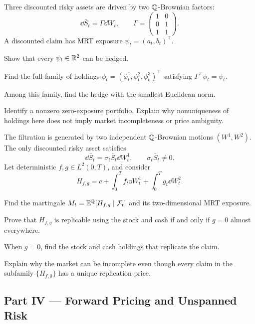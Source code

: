 \begin{exercise}
Three discounted risky assets are driven by two \(\mathbb{Q}\)-Brownian factors:
\[
\dd\bar S_t=\Gamma\dd W_t,
\qquad
\Gamma=
\begin{pmatrix}
1&0\\
0&1\\
1&1
\end{pmatrix}.
\]
A discounted claim has MRT exposure
\(\psi_t=(a_t,b_t)^\top\).
\begin{exparts}
  \item Show that every \(\psi_t\in\mathbb{R}^2\) can be hedged.
  \item Find the full family of holdings
  \(\phi_t=(\phi_t^1,\phi_t^2,\phi_t^3)^\top\) satisfying
  \(\Gamma^\top\phi_t=\psi_t\).
  \item Among this family, find the hedge with the smallest Euclidean norm.
  \item Identify a nonzero zero-exposure portfolio. Explain why nonuniqueness
  of holdings here does not imply market incompleteness or price ambiguity.
\end{exparts}
\end{exercise}

\begin{exercise}
The filtration is generated by two independent \(\mathbb{Q}\)-Brownian motions
\((W^1,W^2)\). The only discounted risky asset satisfies
\[
\dd\bar S_t=\sigma_t\bar S_t\dd W_t^1,
\qquad \sigma_t\bar S_t\neq0.
\]
Let deterministic \(f,g\in L^2(0,T)\), and consider
\[
H_{f,g}
=c+\int_0^Tf_t\dd W_t^1+\int_0^Tg_t\dd W_t^2.
\]
\begin{exparts}
  \item Find the martingale
  \(M_t=\mathbb{E}^{\mathbb{Q}}[H_{f,g}\mid\mathcal{F}_t]\) and its two-dimensional MRT exposure.
  \item Prove that \(H_{f,g}\) is replicable using the stock and cash if and
  only if \(g=0\) almost everywhere.
  \item When \(g=0\), find the stock and cash holdings that replicate the
  claim.
  \item Explain why the market can be incomplete even though every claim in
  the subfamily \(\{H_{f,0}\}\) has a unique replication price.
\end{exparts}
\end{exercise}


\subsection*{Part IV --- Forward Pricing and Unspanned Risk}


